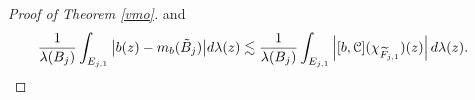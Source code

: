 \documentclass[11pt,a4paper]{amsart}
\numberwithin{equation}{section}
\begin{document}
{\begin{proof}[Proof of   Theorem \ref{vmo}]
%
%
%
and
\begin{align*}
{1\over \lambda(B_j)}\int_{E_{j,1}}\big|b(z)-m_b(\tilde B_j)\big|d\lambda(z)
&\lesssim
{1\over \lambda(B_j)}\int_{E_{j,1}}\left|[b, \EuScript C](\chi_{\widetilde F_{j,1}})(z)\right|d\lambda(z).
\end{align*}
\color{black}


\end{proof}}
\end{document}
